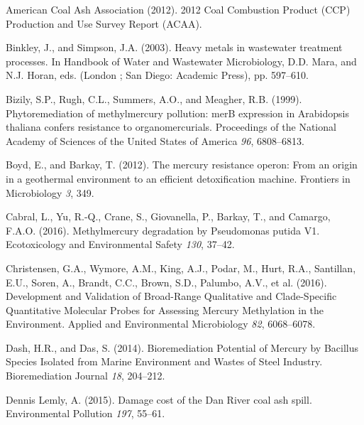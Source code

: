 \documentclass[ms]{uncgdissertationexp}
\theoremstyle{plain}
\theoremstyle{definition}
\theoremstyle{remark}
\begin{document}
  \hypertarget{ref-americancoalashassociation2012CoalCombustion2012}{}
  American Coal Ash Association (2012). 2012 Coal Combustion Product (CCP)
  Production and Use Survey Report (ACAA).
  
  \hypertarget{ref-binkleyHeavyMetalsWastewater2003}{}
  Binkley, J., and Simpson, J.A. (2003). Heavy metals in wastewater
  treatment processes. In Handbook of Water and Wastewater Microbiology,
  D.D. Mara, and N.J. Horan, eds. (London ; San Diego: Academic Press),
  pp. 597--610.
  
  \hypertarget{ref-bizilyPhytoremediationMethylmercuryPollution1999}{}
  Bizily, S.P., Rugh, C.L., Summers, A.O., and Meagher, R.B. (1999).
  Phytoremediation of methylmercury pollution: merB expression in
  Arabidopsis thaliana confers resistance to organomercurials. Proceedings
  of the National Academy of Sciences of the United States of America
  \emph{96}, 6808--6813.
  
  \hypertarget{ref-boydMercuryResistanceOperon2012}{}
  Boyd, E., and Barkay, T. (2012). The mercury resistance operon: From an
  origin in a geothermal environment to an efficient detoxification
  machine. Frontiers in Microbiology \emph{3}, 349.
  
  \hypertarget{ref-cabralMethylmercuryDegradationPseudomonas2016}{}
  Cabral, L., Yu, R.-Q., Crane, S., Giovanella, P., Barkay, T., and
  Camargo, F.A.O. (2016). Methylmercury degradation by Pseudomonas putida
  V1. Ecotoxicology and Environmental Safety \emph{130}, 37--42.
  
  \hypertarget{ref-christensenDevelopmentValidationBroadRange2016}{}
  Christensen, G.A., Wymore, A.M., King, A.J., Podar, M., Hurt, R.A.,
  Santillan, E.U., Soren, A., Brandt, C.C., Brown, S.D., Palumbo, A.V., et
  al. (2016). Development and Validation of Broad-Range Qualitative and
  Clade-Specific Quantitative Molecular Probes for Assessing Mercury
  Methylation in the Environment. Applied and Environmental Microbiology
  \emph{82}, 6068--6078.
  
  \hypertarget{ref-dashBioremediationPotentialMercury2014}{}
  Dash, H.R., and Das, S. (2014). Bioremediation Potential of Mercury by
  Bacillus Species Isolated from Marine Environment and Wastes of Steel
  Industry. Bioremediation Journal \emph{18}, 204--212.
  
  \hypertarget{ref-dennislemlyDamageCostDan2015}{}
  Dennis Lemly, A. (2015). Damage cost of the Dan River coal ash spill.
  Environmental Pollution \emph{197}, 55--61.
  
\end{document}

